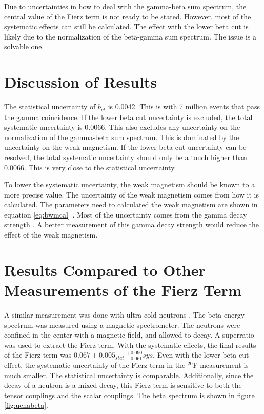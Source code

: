 \documentclass[main.tex]{subfiles}
\begin{document}
Due to uncertainties in how to deal with the gamma-beta sum spectrum, the central value of the Fierz term is not ready to be stated. 
However, most of the systematic effects can still be calculated.
The effect with the lower beta cut is likely due to the normalization of the beta-gamma sum spectrum.
The issue is a solvable one. 

\section{Discussion of Results}

The statistical uncertainty of $b_{gt}$ is 0.0042.
This is with 7 million events that pass the gamma coincidence.
If the lower beta cut uncertainty is excluded, the total systematic uncertainty is 0.0066.
This also excludes any uncertainty on the normalization of the gamma-beta sum spectrum.
This is dominated by the uncertainty on the weak magnetism.
If the lower beta cut uncertainty can be resolved, the total systematic uncertainty should only be a touch higher than 0.0066.
This is very close to the statistical uncertainty. 

To lower the systematic uncertainty, the weak magnetism should be known to a more precise value.
The uncertainty of the weak magnetism comes from how it is calculated.
The parameters need to calculated the weak magnetism are shown in equation \ref{eq:bwmcal} .
Most of the uncertainty comes from the gamma decay strength \cite{Min11}.
A better measurement of this gamma decay strength would reduce the effect of the weak magnetism.

\section{Results Compared to Other Measurements of the Fierz Term}

A similar measurement was done with ultra-cold neutrons \cite{Hic17}.
The beta energy spectrum was measured using a magnetic spectrometer.
The neutrons were confined in the center with a magnetic field, and allowed to decay.
A superratio was used to extract the Fierz term.
With the systematic effects, the final results of the Fierz term was $0.067 \pm 0.005_{stat}$ $ ^{+0.090}_{-0.061} sys$.
Even with the lower beta cut effect, the systematic uncertainty of the Fierz term in the $^{20}$F measurement is much smaller.
The statistical uncertainty is comparable. 
Additionally, since the decay of a neutron is a mixed decay, this Fierz term is sensitive to both the tensor couplings and the scalar couplings.  
The beta spectrum is shown in figure \ref{fig:ucnabeta}.
\end{document}
